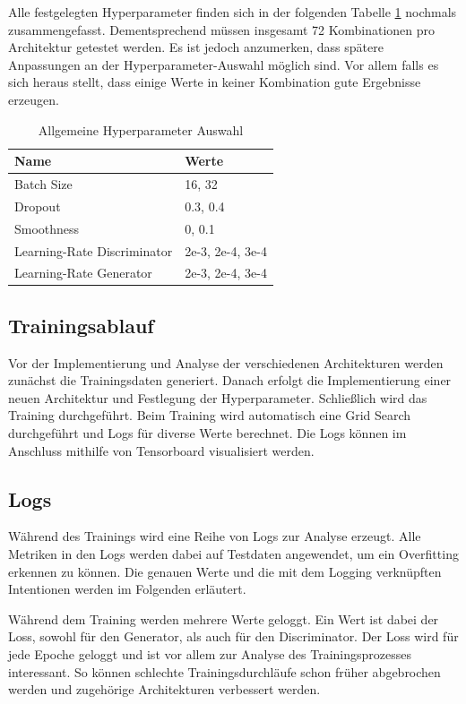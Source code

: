 Alle festgelegten Hyperparameter finden sich in der folgenden Tabelle \ref{table:hyperparameter} nochmals zusammengefasst.
Dementsprechend müssen insgesamt 72 Kombinationen pro Architektur getestet werden. 
Es ist jedoch anzumerken, dass spätere Anpassungen an der Hyperparameter-Auswahl möglich sind.
Vor allem falls es sich heraus stellt, dass einige Werte in keiner Kombination gute Ergebnisse erzeugen.

\begin{table}[H]
	\centering
	\label{table:hyperparameter}
	\begin{tabular}{l l}
		Name                        & Werte            \\ \hline
		Batch Size                  & 16, 32           \\
		Dropout                     & 0.3, 0.4         \\
		Smoothness                  & 0, 0.1           \\
		Learning-Rate Discriminator & 2e-3, 2e-4, 3e-4 \\
		Learning-Rate Generator     & 2e-3, 2e-4, 3e-4
	\end{tabular}
	\caption{Allgemeine Hyperparameter Auswahl}
\end{table}

\subsection{Trainingsablauf}
Vor der Implementierung und Analyse der verschiedenen Architekturen werden zunächst die Trainingsdaten generiert.
Danach erfolgt die Implementierung einer neuen Architektur und Festlegung der Hyperparameter.
Schließlich wird das Training durchgeführt.
Beim Training wird automatisch eine Grid Search durchgeführt und Logs für diverse Werte berechnet.
Die Logs können im Anschluss mithilfe von Tensorboard visualisiert werden.

\subsection{Logs}
Während des Trainings wird eine Reihe von Logs zur Analyse erzeugt.
Alle Metriken in den Logs werden dabei auf Testdaten angewendet, um ein Overfitting erkennen zu können.
Die genauen Werte und die mit dem Logging verknüpften Intentionen werden im Folgenden erläutert.
\newline

Während dem Training werden mehrere Werte geloggt.
Ein Wert ist dabei der Loss, sowohl für den Generator, als auch für den Discriminator.
Der Loss wird für jede Epoche geloggt und ist vor allem zur Analyse des Trainingsprozesses interessant.
So können schlechte Trainingsdurchläufe schon früher abgebrochen werden und zugehörige Architekturen verbessert werden.
\newline

